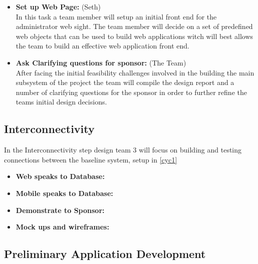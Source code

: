 \documentclass[Letter,11pt]{article}
\begin{document}
\begin{itemize}
			\item\textbf{Set up Web Page:} (Seth)\\
			In this task a team member will setup an initial front end for the administrator web sight. The team member will decide on a set of predefined web objects that can be used to build web applications witch will best allows the team to build an effective web application front end. 
			
			\item\textbf{Ask Clarifying questions for sponsor:} (The Team)\\
			After facing the initial feasibility challenges involved in the building the main subsystem of the project the team will compile the design report and a number of clarifying questions for the sponsor in order to further refine the teams initial design decisions. 
		\end{itemize}
		
		
		
	\subsection{Interconnectivity}\label{connect}
		In the Interconnectivity step design team 3 will focus on building and testing connections between the baseline system, setup in \ref{cyc1}
		\begin{itemize}
			\item\textbf{Web speaks to Database:}\\
			
			
			\item \textbf{Mobile speaks to Database:}\\
			
			\item\textbf{Demonstrate to Sponsor:}\\
			
			\item\textbf{Mock ups and wireframes:}\\
			
		\end{itemize}
		
		\subsection{Preliminary Application Development}\label{dev1}
		
\end{document}
